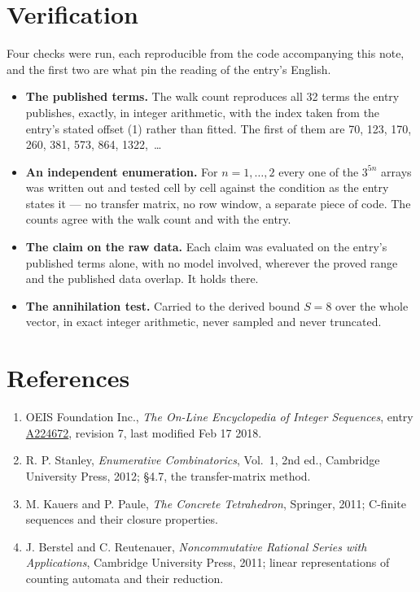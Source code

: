 \documentclass[11pt]{article}
\theoremstyle{definition}
\begin{document}
\section{Verification}

Four checks were run, each reproducible from the code accompanying this note, and the first two are what pin the reading of the entry's English.

\begin{itemize}

\item {\bfseries The published terms.} The walk count reproduces all 32 terms the entry publishes, exactly, in integer arithmetic, with the index taken from the entry's stated offset (1) rather than fitted. The first of them are 70, 123, 170, 260, 381, 573, 864, 1322,~\dots

\item {\bfseries An independent enumeration.} For $n = 1,\dots,2$ every one of the $3^{5n}$ arrays was written out and tested cell by cell against the condition as the entry states it --- no transfer matrix, no row window, a separate piece of code. The counts agree with the walk count and with the entry.

\item {\bfseries The claim on the raw data.} Each claim was evaluated on the entry's published terms alone, with no model involved, wherever the proved range and the published data overlap. It holds there.

\item {\bfseries The annihilation test.} Carried to the derived bound $S = 8$ over the whole vector, in exact integer arithmetic, never sampled and never truncated.

\end{itemize}

\section{References}

\begin{enumerate}

\item OEIS Foundation Inc., \emph{The On-Line Encyclopedia of Integer Sequences}, entry \href{https://oeis.org/A224672}{A224672}, revision 7, last modified Feb 17 2018.

\item R. P. Stanley, \emph{Enumerative Combinatorics}, Vol.~1, 2nd ed., Cambridge University Press, 2012; \S4.7, the transfer-matrix method.

\item M. Kauers and P. Paule, \emph{The Concrete Tetrahedron}, Springer, 2011; C-finite sequences and their closure properties.

\item J. Berstel and C. Reutenauer, \emph{Noncommutative Rational Series with Applications}, Cambridge University Press, 2011; linear representations of counting automata and their reduction.

\end{enumerate}
\end{document}
